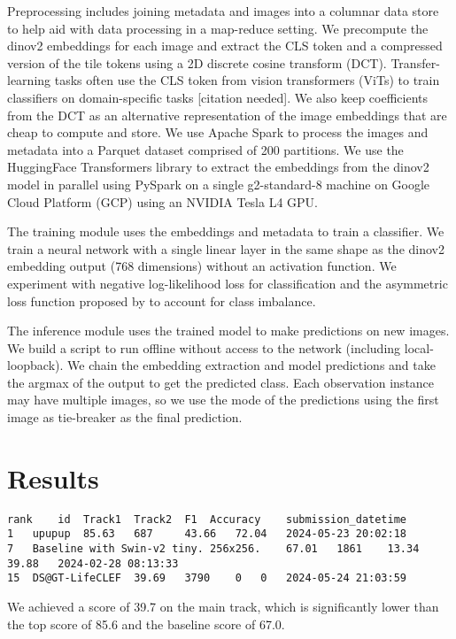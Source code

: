 \documentclass[]{style/ceurart}
\begin{document}
Preprocessing includes joining metadata and images into a columnar data store to help aid with data processing in a map-reduce setting.
We precompute the dinov2 embeddings for each image and extract the CLS token and a compressed version of the tile tokens using a 2D discrete cosine transform (DCT).
Transfer-learning tasks often use the CLS token from vision transformers (ViTs) to train classifiers on domain-specific tasks [citation needed].
We also keep coefficients from the DCT as an alternative representation of the image embeddings that are cheap to compute and store.
We use Apache Spark to process the images and metadata into a Parquet dataset comprised of 200 partitions.
We use the HuggingFace Transformers library to extract the embeddings from the dinov2 model in parallel using PySpark on a single g2-standard-8 machine on Google Cloud Platform (GCP) using an NVIDIA Tesla L4 GPU.

The training module uses the embeddings and metadata to train a classifier.
We train a neural network with a single linear layer in the same shape as the dinov2 embedding output (768 dimensions) without an activation function.
We experiment with negative log-likelihood loss for classification and the asymmetric loss function proposed by \cite{ridnik2021asymmetric} to account for class imbalance.

The inference module uses the trained model to make predictions on new images.
We build a script to run offline without access to the network (including local-loopback).
We chain the embedding extraction and model predictions and take the argmax of the output to get the predicted class.
Each observation instance may have multiple images, so we use the mode of the predictions using the first image as tie-breaker as the final prediction.

\section{Results}

\begin{verbatim}
rank 	id 	Track1 	Track2 	F1 	Accuracy 	submission_datetime
1 	upupup 	85.63 	687 	43.66 	72.04 	2024-05-23 20:02:18
7 	Baseline with Swin-v2 tiny. 256x256. 	67.01 	1861 	13.34 	39.88 	2024-02-28 08:13:33
15 	DS@GT-LifeCLEF 	39.69 	3790 	0 	0 	2024-05-24 21:03:59
\end{verbatim}

We achieved a score of 39.7 on the main track, which is significantly lower than the top score of 85.6 and the baseline score of 67.0.
\end{document}
